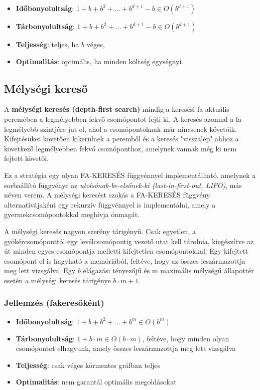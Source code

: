\begin{itemize}
    \item {\bf Időbonyolultság}: $1 + b + b^2 + \ldots + b^{d+1} - b \in O(b^{d+1})$
    \item {\bf Tárbonyolultság}: $1 + b + b^2 + \ldots + b^{d+1} - b \in O(b^{d+1})$
    \item {\bf Teljesség}: teljes, ha $b$ véges,
    \item {\bf Optimalitás}: optimális, ha minden költség egységnyi.
\end{itemize}

\subsection{Mélységi kereső}

A {\bf mélységi keresés (depth-first search)} mindig a keresési fa aktuális
peremében a legmélyebben fekvő csomópontot fejti ki. A keresés azonnal a fa
legmélyebb szintjére jut el, ahol a csomópontoknak már nincsenek követőik.
Kifejtésüket követően kikerülnek a peremből és a keresés "visszalép" ahhoz a
következő legmélyebben fekvő csomóponthoz, amelynek vannak még ki nem fejtett
követői.

Ez a stratégia egy olyan FA-KERESÉS függvénnyel implementálható, amelynek a
sorbaállító függvénye az {\it utolsónak-be-elsőnek-ki (last-in-first-out,
LIFO)}, más néven verem. A mélységi keresést szokás a FA-KERESÉS függvény
alternatívájaként egy rekurzív függvénnyel is implementálni, amely a
gyermekcsomópontokkal meghívja önmagát.

A mélységi keresés nagyon szerény tárigényű. Csak egyetlen, a
gyökércsomóponttól egy levélcsomópontig vezető utat kell tárolnia, kiegészítve
az út minden egyes csomópontja melletti kifejtetlen csomópontokkal. Egy
kifejtett csomópont el is hagyható a memóriából, feltéve, hogy az összes
leszármazottja meg lett vizsgálva. Egy $b$ elágazási tényezőjű és m maximális
mélységű állapottér esetén a mélységi keresés tárigénye $b\cdot m + 1$.

\subsubsection{Jellemzés (fakeresőként)}

\begin{itemize}
    \item {\bf Időbonyolultság}: $1 + b + b^2 + \ldots + b^m \in O(b^m)$
    \item {\bf Tárbonyolultság}: $1 + b\cdot m \in O(b \cdot m)$, feltéve, hogy
        minden olyan csomópontot elhagyunk, amely összes leszármazottja meg
        lett vizsgálva
    \item {\bf Teljesség}: csak véges körmentes gráfban teljes
    \item {\bf Optimalitás}: nem garantál optimális megoldásokat
\end{itemize}

